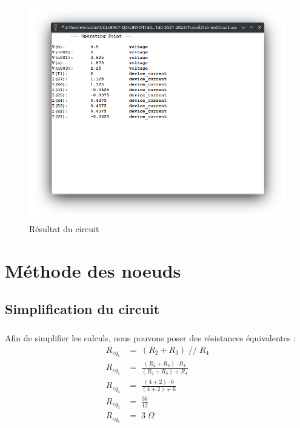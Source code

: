     \begin{figure}[H]
        \centering
        \includegraphics[scale=0.5]{../pictures/resultat.png} %
        \caption{Résultat du circuit}
    \end{figure}




    \section{Méthode des noeuds}
    \subsection{Simplification du circuit}
        \subparagraph{}Afin de simplifier les calculs, nous pouvons poser des résistances équivalentes :
            \begin{align*}
                R_{eq_{1}}&=\; (R_2 + R_3)\;//\;R_4 \\
                R_{eq_{1}}&=\; \frac{(R_2 + R_3) \cdot R_4}{(R_2 + R_3) + R_4} \\
                R_{eq_{1}}&=\; \frac{(4 + 2) \cdot 6}{(4 + 2) + 6} \\
                R_{eq_{1}}&=\; \frac{36}{12} \\
                R_{eq_{1}}&=\; 3\;\Omega
            \end{align*}
            
